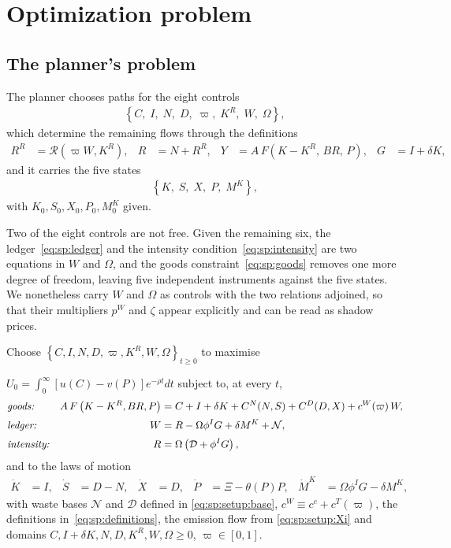 ﻿\section{Optimization problem}\label{sec:sp:opt}

\subsection{The planner's problem}\label{sec:sp:opt:problem}

 The planner chooses paths for the eight controls
\begin{align}
    \left\{C,\;I,\;N,\;D,\;\varpi,\;K^R,\;W,\;\Omega\right\},
\label{eq:sp:controls}
\end{align}
which determine the remaining flows through the definitions
\begin{align}
R^R &= \mathcal R\left(\varpi W,K^R\right),
&
R &= N+R^R,
&
Y &= A\,F\left(K-K^R,\,BR,\,P\right),
&
G &= I+\delta K,
\label{eq:sp:definitions}
\end{align}
and it carries the five states
\begin{align}
\left\{K,\;S,\;X,\;P,\;M^K\right\},
\label{eq:sp:states}
\end{align}
with $K_0,S_0,X_0,P_0,M^K_0$ given.

Two of the eight controls are not free. Given the remaining six, the ledger~\eqref{eq:sp:ledger} and the intensity condition~\eqref{eq:sp:intensity} are two equations in $W$ and $\Omega$, and the goods constraint~\eqref{eq:sp:goods} removes one more degree of freedom, leaving five independent instruments against the five states. We nonetheless carry $W$ and $\Omega$ as controls with the two relations adjoined, so that their multipliers $p^W$ and $\zeta$ appear explicitly and can be read as shadow prices.


\begin{problem}\label{prob:sp}
Choose $\left\{C,I,N,D,\varpi,K^R,W,\Omega\right\}_{t\ge0}$ to maximise

\noindent $U_0=\int_0^\infty\left[u(C)-v(P)\right]e^{-\rho t}dt$ subject to, at every $t$,
\begin{align}
&\text{\emph{goods:}}
&
A\,F\left(K-K^R,BR,P\right) &= C+I+\delta K+C^N(N,S)+C^D(D,X)+c^W\!\left(\varpi\right)W,
\label{eq:sp:goods}
\\[0.2em]
&\text{\emph{ledger:}}
&
W &= R-\Omega\phi^I G+\delta M^K+\mathcal N,
\label{eq:sp:ledger}
\\[0.2em]
&\text{\emph{intensity:}}
&
R &= \Omega\left(\mathcal D+\phi^IG\right),
\label{eq:sp:intensity}
\end{align}
and to the laws of motion
\begin{align}
\dot K &= I,
&
\dot S &= D-N,
&
\dot X &= D,
&
\dot P &= \Xi-\theta(P)P,
&
\dot M^K &= \Omega\phi^I G-\delta M^K,
\label{eq:sp:states-motion}
\end{align}
with waste bases $\mathcal{N}$ and $\mathcal{D}$ defined in \eqref{eq:sp:setup:base}, $c^W \equiv c^c+ c^T(\varpi)$, the definitions in~\eqref{eq:sp:definitions}, the emission flow from \eqref{eq:sp:setup:Xi} and domains $C,I+\delta K,N,D,K^R,W,\Omega\ge0$, $\varpi\in\left[0,1\right]$.
\end{problem}

